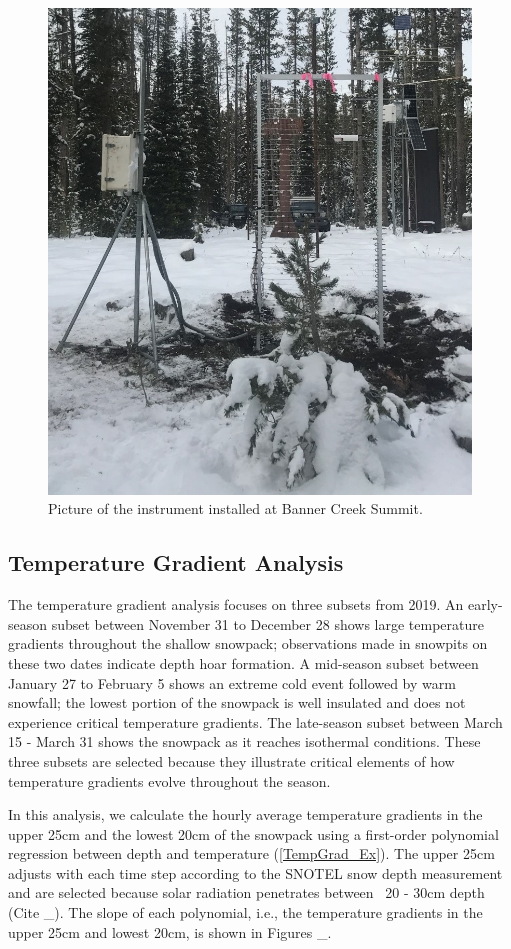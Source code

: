  \begin{figure}[H]
    \centering
    \includegraphics[width=0.7\linewidth]{figures/Banner_Sensor.jpg}
    \caption{Picture of the instrument installed at Banner Creek Summit.}
    \label{fig:Banner_Sensor}
 \end{figure}
 
\subsection{Temperature Gradient Analysis}
The temperature gradient analysis focuses on three subsets from 2019. An early-season subset between November 31 to December 28 shows large temperature gradients throughout the shallow snowpack; observations made in snowpits on these two dates indicate depth hoar formation. A mid-season subset between January 27 to February 5 shows an extreme cold event followed by warm snowfall; the lowest portion of the snowpack is well insulated and does not experience critical temperature gradients. The late-season subset between March 15 - March 31 shows the snowpack as it reaches isothermal conditions. These three subsets are selected because they illustrate critical elements of how temperature gradients evolve throughout the season. 

In this analysis, we calculate the hourly average temperature gradients in the upper 25cm and the lowest 20cm of the snowpack using a first-order polynomial regression between depth and temperature (\ref{TempGrad_Ex}).  The upper 25cm adjusts with each time step according to the SNOTEL snow depth measurement and are selected because solar radiation penetrates between ~20 - 30cm depth (Cite \_). The slope of each polynomial, i.e., the temperature gradients in the upper 25cm and lowest 20cm, is shown in Figures \_.  

